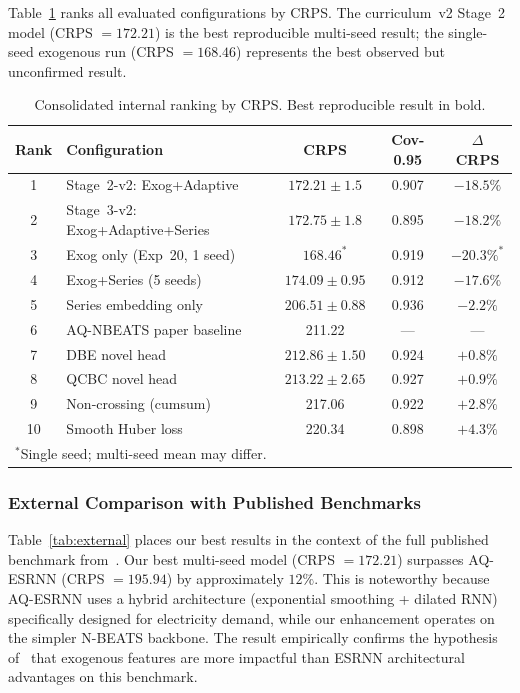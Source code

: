 Table~\ref{tab:internal} ranks all evaluated configurations by CRPS.
The curriculum~v2 Stage~2 model (CRPS $= 172.21$) is the best
reproducible multi-seed result; the single-seed exogenous run
(CRPS $= 168.46$) represents the best observed but unconfirmed result.

\begin{table}[H]
\centering
\caption{Consolidated internal ranking by CRPS. Best reproducible
  result in bold.}
\label{tab:internal}
\begin{tabular}{clccc}
\toprule
\textbf{Rank} & \textbf{Configuration} & \textbf{CRPS} &
\textbf{Cov-0.95} & \textbf{$\Delta$CRPS} \\
\midrule
1  & Stage~2-v2: Exog+Adaptive        & $\mathbf{172.21}\pm1.5$ & 0.907 & $-18.5\%$   \\
2  & Stage~3-v2: Exog+Adaptive+Series & $172.75\pm1.8$          & 0.895 & $-18.2\%$   \\
3  & Exog only (Exp~20, 1 seed)       & $168.46^*$              & 0.919 & $-20.3\%^*$ \\
4  & Exog+Series (5 seeds)            & $174.09\pm0.95$         & 0.912 & $-17.6\%$   \\
5  & Series embedding only            & $206.51\pm0.88$         & 0.936 & $-2.2\%$    \\
6  & AQ-NBEATS paper baseline         & 211.22                  & ---   & ---         \\
7  & DBE novel head                   & $212.86\pm1.50$         & 0.924 & $+0.8\%$    \\
8  & QCBC novel head                  & $213.22\pm2.65$         & 0.927 & $+0.9\%$    \\
9  & Non-crossing (cumsum)            & 217.06                  & 0.922 & $+2.8\%$    \\
10 & Smooth Huber loss                & 220.34                  & 0.898 & $+4.3\%$    \\
\bottomrule
\multicolumn{5}{l}{\footnotesize $^*$Single seed; multi-seed mean may differ.}
\end{tabular}
\end{table}

\subsubsection{External Comparison with Published Benchmarks}

Table~\ref{tab:external} places our best results in the context of the
full published benchmark from~\cite{smyl2025anyquantile}.
Our best multi-seed model (CRPS $= 172.21$) surpasses AQ-ESRNN
(CRPS $= 195.94$) by approximately $12\%$.
This is noteworthy because AQ-ESRNN uses a hybrid architecture
(exponential smoothing + dilated RNN) specifically designed for
electricity demand, while our enhancement operates on the simpler
N-BEATS backbone.  The result empirically confirms the hypothesis
of~\cite{smyl2025anyquantile} that exogenous features are more impactful
than ESRNN architectural advantages on this benchmark.


